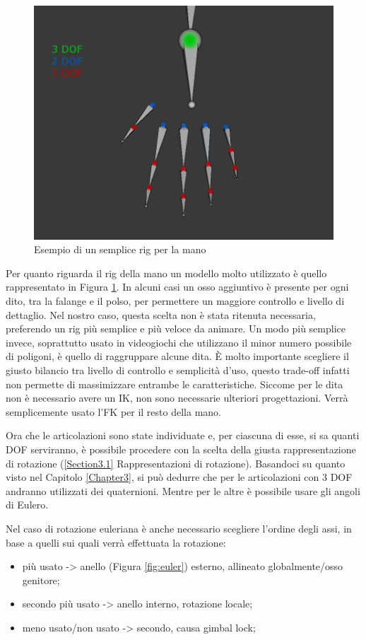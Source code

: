 \begin{figure}
\centering
\includegraphics[width=.8\textwidth]{Figures/hand}
\decoRule
\caption[Rig mano]{Esempio di un semplice rig per la mano}
\label{fig:hand}
\end{figure}

\newpage
Per quanto riguarda il rig della mano un modello molto utilizzato è quello rappresentato in Figura \ref{fig:hand}.
In alcuni casi un osso aggiuntivo è presente per ogni dito, tra la falange e il polso, per permettere un maggiore controllo e livello di dettaglio.
Nel nostro caso, questa scelta non è stata ritenuta necessaria, preferendo un rig più semplice e più veloce da animare. 
Un modo più semplice invece, soprattutto usato in videogiochi che utilizzano il minor numero possibile di poligoni, è quello di raggruppare alcune dita.
È molto importante scegliere il giusto bilancio tra livello di controllo e semplicità d'uso, questo trade-off infatti non permette di massimizzare entrambe le caratteristiche.
Siccome per le dita non è necessario avere un IK, non sono necessarie ulteriori progettazioni. Verrà semplicemente usato l'FK per il resto della mano.

Ora che le articolazioni sono state individuate e, per ciascuna di esse, si sa quanti DOF serviranno, è possibile procedere con la scelta della giusta rappresentazione di rotazione (\ref{Section3.1} Rappresentazioni di rotazione).
Basandoci su quanto visto nel Capitolo \ref{Chapter3}, si può dedurre che per le articolazioni con 3 DOF andranno utilizzati dei quaternioni. Mentre per le altre è possibile usare gli angoli di Eulero.

Nel caso di rotazione euleriana è anche necessario scegliere l'ordine degli assi, in base a quelli sui quali verrà effettuata la rotazione:
\begin{itemize}
    \item più usato -> anello (Figura \ref{fig:euler}) esterno, allineato globalmente/osso genitore;
    \item secondo più usato -> anello interno, rotazione locale;
    \item meno usato/non usato -> secondo, causa gimbal lock;
\end{itemize}


